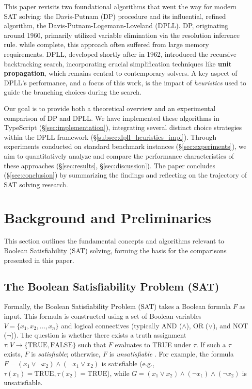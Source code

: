 \documentclass[12pt, a4paper]{article}
\begin{document}
This paper revisits two foundational algorithms that went the way for modern SAT solving: the Davis-Putnam (DP) procedure and its influential, refined algorithm, the Davis-Putnam-Logemann-Loveland (DPLL). DP, originating around 1960, primarily utilized variable elimination via the resolution inference rule. while complete, this approach often suffered from large memory requirements. DPLL, developed shortly after in 1962, introduced the recursive backtracking search, incorporating crucial simplification techniques like \textbf{unit propagation}, which remains central to contemporary solvers. A key aspect of DPLL's performance, and a focus of this work, is the impact of \emph{heuristics} used to guide the branching choices during the search.

Our goal is to provide both a theoretical overview and an experimental comparison of DP and DPLL. We have implemented these algorithms in TypeScript (\S\ref{sec:implementation}), integrating several distinct choice strategies within the DPLL framework (\S\ref{subsec:dpll_heuristics_impl}). Through experiments conducted on standard benchmark instances (\S\ref{sec:experiments}), we aim to quantitatively analyze and compare the performance characteristics of these approaches (\S\ref{sec:results}, \S\ref{sec:discussion}). The paper concludes (\S\ref{sec:conclusion}) by summarizing the findings and reflecting on the trajectory of SAT solving research.


\section{Background and Preliminaries}
\label{sec:background}

This section outlines the fundamental concepts and algorithms relevant to Boolean Satisfiability (SAT) solving, forming the basis for the comparisons presented in this paper.

\subsection{The Boolean Satisfiability Problem (SAT)}
\label{subsec:sat_definition}

Formally, the Boolean Satisfiability Problem (SAT) takes a Boolean formula $F$ as input. This formula is constructed using a set of Boolean variables $V = \{x_1, x_2, ..., x_n\}$ and logical connectives (typically AND ($\land$), OR ($\lor$), and NOT ($\lnot$)). The question is whether there exists a truth assignment $\tau: V \to \{\text{TRUE}, \text{FALSE}\}$ such that $F$ evaluates to TRUE under $\tau$. If such a $\tau$ exists, $F$ is \emph{satisfiable}; otherwise, $F$ is \emph{unsatisfiable} \cite{Autoblocks}. For example, the formula $F = (x_1 \lor \lnot x_2) \land (\lnot x_1 \lor x_2)$ is satisfiable (e.g., $\tau(x_1)=\text{TRUE}, \tau(x_2)=\text{TRUE}$), while $G = (x_1 \lor x_2) \land (\lnot x_1) \land (\lnot x_2)$ is unsatisfiable.
\end{document}
